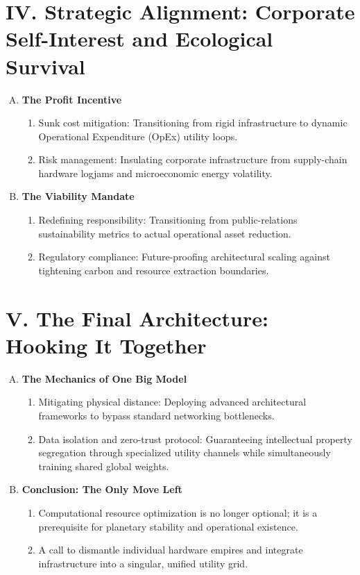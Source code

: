 \documentclass{article}
\begin{document}
	\section*{IV. Strategic Alignment: Corporate Self-Interest and Ecological Survival}
	\begin{enumerate}[A.]
		\item \textbf{The Profit Incentive}
		\begin{enumerate}[1.]
			\item Sunk cost mitigation: Transitioning from rigid infrastructure to dynamic Operational Expenditure (OpEx) utility loops.
			\item Risk management: Insulating corporate infrastructure from supply-chain hardware logjams and microeconomic energy volatility.
		\end{enumerate}
		\item \textbf{The Viability Mandate}
		\begin{enumerate}[1.]
			\item Redefining responsibility: Transitioning from public-relations sustainability metrics to actual operational asset reduction.
			\item Regulatory compliance: Future-proofing architectural scaling against tightening carbon and resource extraction boundaries.
		\end{enumerate}
	\end{enumerate}
	
	\section*{V. The Final Architecture: Hooking It Together}
	\begin{enumerate}[A.]
		\item \textbf{The Mechanics of One Big Model}
		\begin{enumerate}[1.]
			\item Mitigating physical distance: Deploying advanced architectural frameworks to bypass standard networking bottlenecks.
			\item Data isolation and zero-trust protocol: Guaranteeing intellectual property segregation through specialized utility channels while simultaneously training shared global weights.
		\end{enumerate}
		\item \textbf{Conclusion: The Only Move Left}
		\begin{enumerate}[1.]
			\item Computational resource optimization is no longer optional; it is a prerequisite for planetary stability and operational existence.
			\item A call to dismantle individual hardware empires and integrate infrastructure into a singular, unified utility grid.
		\end{enumerate}
	\end{enumerate}
	
\end{document}
